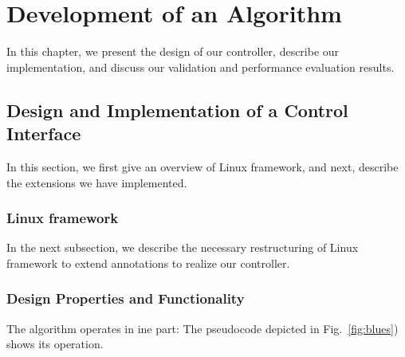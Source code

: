 \chapter{Development of an Algorithm}
\label{chap:controller}

In this chapter, we present the design of our controller, describe  our implementation, and discuss our validation and performance evaluation results.
%

\section{Design and Implementation of a Control Interface}
\label{sec:controller:design}

In this section, we first give an overview of Linux framework, and next, describe the extensions we have implemented.
%


\subsection{Linux framework}

In the next subsection, we describe the necessary restructuring of Linux framework to extend annotations to realize our controller.



\subsection{Design Properties and Functionality}
\label{sec:controller:functions}

The algorithm operates in ine part: The pseudocode depicted in Fig.~\ref{fig:blues}) shows its operation.

